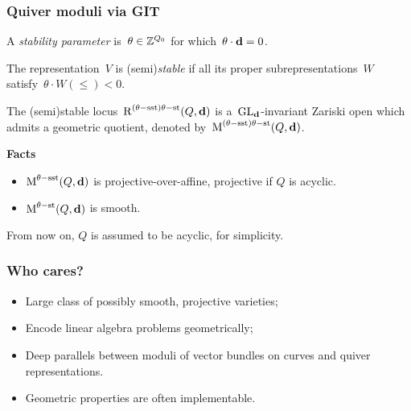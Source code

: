 \documentclass{beamer}
\begin{document}
\begin{frame}
    \frametitle{Quiver moduli via GIT}
A \emph{stability parameter} is~$\theta \in \mathbb{Z}^{Q_0}$
for which~$\theta \cdot \mathbf{d} = 0$. \pause
\begin{definition}
The representation~$V$ is (semi)\emph{stable}
if all its proper subrepresentations~$W$ satisfy~$\theta \cdot W (\leq)< 0$.
\end{definition} \pause
\begin{theorem}
The (semi)stable locus~$\operatorname{R}^{(\theta-\mathrm{sst})\theta-\mathrm{st}}(Q, \mathbf{d})$
is a~$\operatorname{GL}_{\mathbf{d}}$-invariant Zariski open which admits a geometric quotient,
denoted by~$\operatorname{M}^{(\theta-\mathrm{sst})\theta-\mathrm{st}}(Q, \mathbf{d})$.
\end{theorem} \pause

\textbf{Facts} \pause

\begin{itemize}
    \item $\operatorname{M}^{\theta-\mathrm{sst}}(Q, \mathbf{d})$ is projective-over-affine,
    projective if $Q$ is acyclic.
    \item $\operatorname{M}^{\theta-\mathrm{st}}(Q, \mathbf{d})$ is smooth.
\end{itemize} \pause
From now on, $Q$ is assumed to be acyclic, for simplicity.
\end{frame}

\begin{frame}
    \frametitle{Who cares?}
\begin{itemize}
    \item Large class of possibly smooth, projective varieties; \pause
    \item Encode linear algebra problems geometrically; \pause
    \item Deep parallels between moduli of vector bundles on curves
        and quiver representations. \pause
    \item Geometric properties are often implementable.
\end{itemize}

    

\end{frame}
\end{document}
